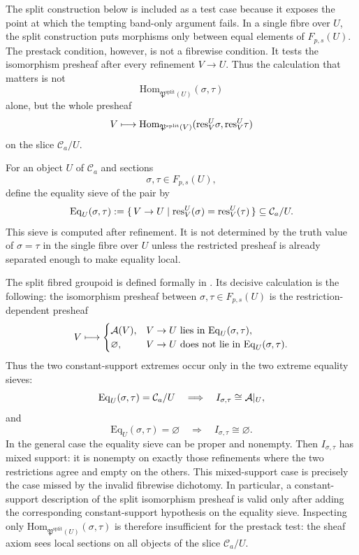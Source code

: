 The split construction below is included as a test case because it exposes the
point at which the tempting band-only argument fails. In a single fibre over
$U$, the split construction puts morphisms only between equal elements of
$F_{p,s}(U)$. The prestack condition, however, is not a fibrewise condition. It
tests the isomorphism presheaf after every refinement $V\to U$. Thus the
calculation that matters is not
\[
\mathrm{Hom}_{\mathfrak P^{\mathrm{split}}(U)}(\sigma,\tau)
\]
alone, but the whole presheaf
\[
V\longmapsto
\mathrm{Hom}_{\mathfrak P^{\mathrm{split}}(V)}
(\mathrm{res}_V^U\sigma,\mathrm{res}_V^U\tau)
\]
on the slice $\mathcal C_a/U$.

\begin{definition}\label{def:equality-sieve-pair}
For an object $U$ of $\mathcal C_a$ and sections
\[
\sigma,\tau\in F_{p,s}(U),
\]
define the equality sieve of the pair by
\[
\mathrm{Eq}_U(\sigma,\tau)
:=\{\,V\to U\mid \mathrm{res}_V^U(\sigma)=\mathrm{res}_V^U(\tau)\,\}
\subseteq \mathcal C_a/U.
\]
This sieve is computed after refinement. It is not determined by the truth value
of $\sigma=\tau$ in the single fibre over $U$ unless the restricted presheaf is
already separated enough to make equality local.
\end{definition}

The split fibred groupoid is defined formally in
. Its decisive calculation is the following:
the isomorphism presheaf between
$\sigma,\tau\in F_{p,s}(U)$ is the restriction-dependent presheaf
\[
V\longmapsto
\begin{cases}
\mathcal{A}(V), & V\to U \text{ lies in } \mathrm{Eq}_U(\sigma,\tau),\\
\varnothing, & V\to U \text{ does not lie in } \mathrm{Eq}_U(\sigma,\tau).
\end{cases}
\]
Thus the two constant-support extremes occur only in the two extreme equality
sieves:
\[
\mathrm{Eq}_U(\sigma,\tau)=\mathcal C_a/U
\quad\Longrightarrow\quad
I_{\sigma,\tau}\cong \mathcal{A}|_U,
\]
and
\[
\mathrm{Eq}_U(\sigma,\tau)=\varnothing
\quad\Longrightarrow\quad
I_{\sigma,\tau}\cong\varnothing.
\]
In the general case the equality sieve can be proper and nonempty. Then
$I_{\sigma,\tau}$ has mixed support: it is nonempty on exactly those refinements
where the two restrictions agree and empty on the others. This mixed-support
case is precisely the case missed by the invalid fibrewise dichotomy. In
particular, a constant-support description of the split isomorphism presheaf is
valid only after adding the corresponding constant-support hypothesis on the
equality sieve. Inspecting only
$\mathrm{Hom}_{\mathfrak P^{\mathrm{split}}(U)}(\sigma,\tau)$ is therefore
insufficient for the prestack test: the sheaf axiom sees local sections on all
objects of the slice $\mathcal C_a/U$.

